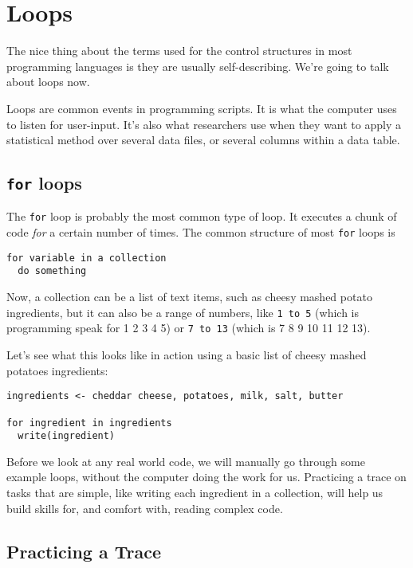 \documentclass[
]{book}
\begin{document}
\chapter{Loops}\label{loops}

The nice thing about the terms used for the control structures in most programming languages is they are usually self-describing. We're going to talk about loops now.

Loops are common events in programming scripts. It is what the computer uses to listen for user-input. It's also what researchers use when they want to apply a statistical method over several data files, or several columns within a data table.

\section{\texorpdfstring{\texttt{for} loops}{for loops}}\label{for-loops}

The \texttt{for} loop is probably the most common type of loop. It executes a chunk of code \emph{for} a certain number of times. The common structure of most \texttt{for} loops is

\begin{verbatim}
for variable in a collection
  do something
\end{verbatim}

Now, a collection can be a list of text items, such as cheesy mashed potato ingredients, but it can also be a range of numbers, like \texttt{1\ to\ 5} (which is programming speak for 1 2 3 4 5) or \texttt{7\ to\ 13} (which is 7 8 9 10 11 12 13).

Let's see what this looks like in action using a basic list of cheesy mashed potatoes ingredients:

\begin{verbatim}
ingredients <- cheddar cheese, potatoes, milk, salt, butter

for ingredient in ingredients
  write(ingredient)
\end{verbatim}

Before we look at any real world code, we will manually go through some example loops, without the computer doing the work for us. Practicing a trace on tasks that are simple, like writing each ingredient in a collection, will help us build skills for, and comfort with, reading complex code.

\section{Practicing a Trace}\label{practicing-a-trace}
\end{document}
